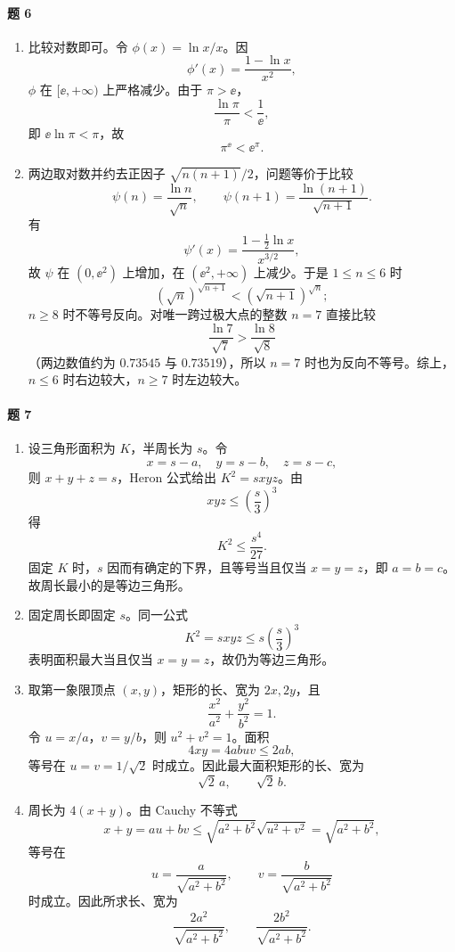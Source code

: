 \paragraph{题 6}
\begin{xsolution}
\begin{enumerate}[label=(\arabic*)]
  \item 比较对数即可。令 $\phi(x)=\ln x/x$。因
  \[
    \phi'(x)=\frac{1-\ln x}{x^2},
  \]
  $\phi$ 在 $[\ee,+\infty)$ 上严格减少。由于 $\pi>\ee$，
  \[
    \frac{\ln\pi}{\pi}<\frac1\ee,
  \]
  即 $\ee\ln\pi<\pi$，故
  \[
    \boxed{\pi^{\ee}<\ee^\pi}.
  \]

  \item 两边取对数并约去正因子 $\sqrt{n(n+1)}/2$，问题等价于比较
  \[
    \psi(n)=\frac{\ln n}{\sqrt n},
    \qquad
    \psi(n+1)=\frac{\ln(n+1)}{\sqrt{n+1}}.
  \]
  有
  \[
    \psi'(x)=\frac{1-\frac12\ln x}{x^{3/2}},
  \]
  故 $\psi$ 在 $(0,\ee^2)$ 上增加，在 $(\ee^2,+\infty)$ 上减少。于是 $1\le n\le6$ 时
  \[
    (\sqrt n)^{\sqrt{n+1}}<(\sqrt{n+1})^{\sqrt n};
  \]
  $n\ge8$ 时不等号反向。对唯一跨过极大点的整数 $n=7$ 直接比较
  \[
    \frac{\ln7}{\sqrt7}>\frac{\ln8}{\sqrt8}
  \]
  （两边数值约为 $0.73545$ 与 $0.73519$），所以 $n=7$ 时也为反向不等号。综上，$n\le6$ 时右边较大，$n\ge7$ 时左边较大。
\end{enumerate}
\end{xsolution}

\paragraph{题 7}
\begin{xsolution}
\begin{enumerate}[label=(\arabic*)]
  \item 设三角形面积为 $K$，半周长为 $s$。令
  \[
    x=s-a,\quad y=s-b,\quad z=s-c,
  \]
  则 $x+y+z=s$，Heron 公式给出 $K^2=sxyz$。由
  \[
    xyz\le\left(\frac s3\right)^3
  \]
  得
  \[
    K^2\le\frac{s^4}{27}.
  \]
  固定 $K$ 时，$s$ 因而有确定的下界，且等号当且仅当 $x=y=z$，即 $a=b=c$。故周长最小的是等边三角形。

  \item 固定周长即固定 $s$。同一公式
  \[
    K^2=sxyz\le s\left(\frac s3\right)^3
  \]
  表明面积最大当且仅当 $x=y=z$，故仍为等边三角形。

  \item 取第一象限顶点 $(x,y)$，矩形的长、宽为 $2x,2y$，且
  \[
    \frac{x^2}{a^2}+\frac{y^2}{b^2}=1.
  \]
  令 $u=x/a$，$v=y/b$，则 $u^2+v^2=1$。面积
  \[
    4xy=4abuv\le2ab,
  \]
  等号在 $u=v=1/\sqrt2$ 时成立。因此最大面积矩形的长、宽为
  \[
    \boxed{\sqrt2\,a,\qquad \sqrt2\,b}.
  \]

  \item 周长为 $4(x+y)$。由 Cauchy 不等式
  \[
    x+y=au+bv\le\sqrt{a^2+b^2}\sqrt{u^2+v^2}=\sqrt{a^2+b^2},
  \]
  等号在
  \[
    u=\frac a{\sqrt{a^2+b^2}},\qquad
    v=\frac b{\sqrt{a^2+b^2}}
  \]
  时成立。因此所求长、宽为
  \[
    \boxed{
    \frac{2a^2}{\sqrt{a^2+b^2}},\qquad
    \frac{2b^2}{\sqrt{a^2+b^2}}}.
  \]
\end{enumerate}
\end{xsolution}

